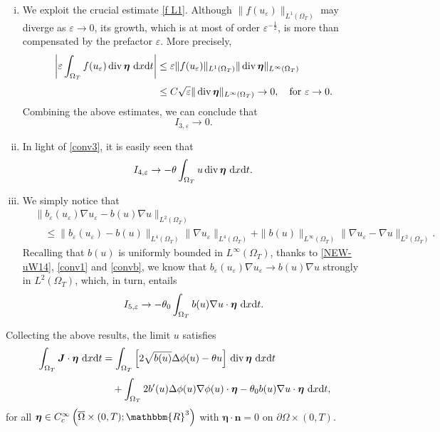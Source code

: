 \documentclass[11pt,  reqno]{amsart}%
\theoremstyle{plain}
\theoremstyle{definition}
\theoremstyle{remark}
\numberwithin{equation}{section}
\newcommand{\ve}{\varepsilon}
\def\div{\,\mathrm{div}}
\newcommand{\dx}{\textup{d}x}
\newcommand{\dt}{\textup{d}t}
\begin{document}
\begin{enumerate}[i)]
\item We exploit the crucial estimate \eqref{f L1}. Although $\|f(u_\ve)\|_{L^1(\Omega_T)}$ may diverge as $\ve \to 0$, its growth, which is at most of order $\ve^{-\frac12}$, is more than compensated by the prefactor $\ve$. 
More precisely, 
\begin{align*}
    \left|   \ve  \int_{\Omega_T} f(u_\ve) \div \, \boldsymbol{\eta} \ \dx \dt \right|&\le \ve \|f(u_\ve)\|_{L^1(\Omega_T)} \|\div \, \boldsymbol{\eta}\|_{L^\infty(\Omega_T)} \\[3pt]
    &\le C\sqrt{\ve} \|\div \, \boldsymbol{\eta}\|_{L^\infty(\Omega_T)} \to 0, \quad \textrm{for }\ve \to 0.
\end{align*}
Combining the above estimates, we can conclude that
$$
I_{3, \ve} \to 0.
$$

\item In light of \eqref{conv3}, it is easily seen that
$$
 I_{4,\ve} \to  - \theta \int_{\Omega_T} u \div \,  \boldsymbol{\eta}  \ \dx \dt.
$$

\item 
We simply notice that 
\begin{align*}
&\|  b_\ve(u_\ve) \nabla u_\ve - b(u) \nabla u\|_{L^2(\Omega_T)}
\\[3pt]
&\quad \leq 
\|  b_\ve(u_\ve) - b(u) \|_{L^4(\Omega_T)}\| \nabla u_\ve\|_{L^4(\Omega_T)}
+
\|  b(u)\|_{L^\infty(\Omega_T)} \| \nabla u_\ve - \nabla u\|_{L^2(\Omega_T)}.
\end{align*}
Recalling that $b(u)$ is uniformly bounded in $L^\infty(\Omega_T)$, thanks to \eqref{NEW-uW14}, \eqref{conv1} and \eqref{convb}, we know that $b_\ve(u_\ve) \nabla u_\ve \to b(u) \nabla u$ strongly in $L^2(\Omega_T)$, which, in turn, entails 
$$
I_{5, \ve} \to - \theta_0 \int_{\Omega_T} b(u) \nabla u \cdot  \boldsymbol{\eta} \ \dx \dt.
$$
\end{enumerate}
Collecting the above results, the limit $u$ satisfies 
\begin{align*}
\int_{\Omega_T} \boldsymbol{J} \cdot \boldsymbol{\eta} \ \dx \dt &= \int_{\Omega_T} \left[2\sqrt{b(u)}\Delta \phi(u)-
\theta u \right]\div\,  \boldsymbol{\eta} \ \dx \dt  \notag 
\\[3pt]
& \quad + \int_{\Omega_T} 2 b'(u) \Delta \phi(u)\nabla \phi(u) \cdot \boldsymbol{\eta} 
- \theta_0 b(u) \nabla u \cdot \boldsymbol{\eta} \ \dx \dt, 
\end{align*}
for all $\boldsymbol{\eta} \in C_c^\infty\left( \overline{\Omega}\times (0,T); \mathbbm{R}^3\right)$ with $\boldsymbol{\eta} \cdot \mathbf{n}=0$ on $\partial \Omega \times(0,T)$. 
\end{document}
